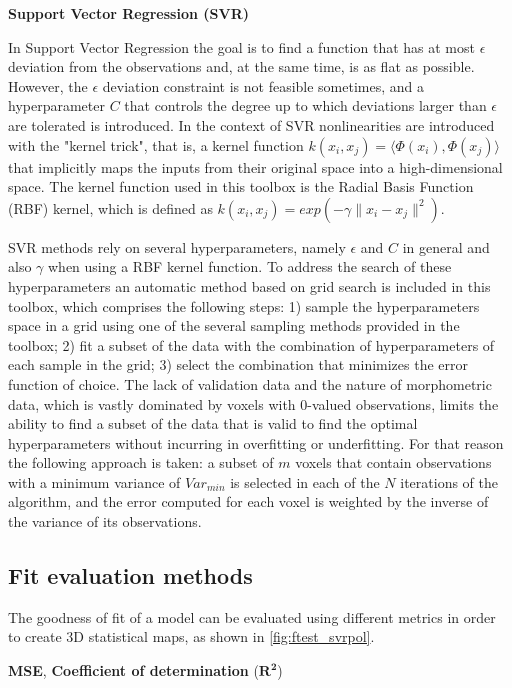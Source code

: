 \documentclass{article}
\begin{document}
\textbf{Support Vector Regression (SVR)} 

In Support Vector Regression the goal is to find a function that has at most $\epsilon$ deviation from the observations and, at the same time, is as flat as possible. However, the $\epsilon$ deviation constraint is not feasible sometimes, and a hyperparameter $C$ that controls the degree up to which deviations larger than $\epsilon$ are tolerated is introduced. 
In the context of SVR nonlinearities are introduced with the "kernel trick", that is, a kernel function $ k(x_i, x_j) = \langle \Phi(x_i), \Phi(x_j) \rangle $ that implicitly maps the inputs from their original space into a high-dimensional space. The kernel function used in this toolbox is the Radial Basis Function (RBF) kernel, which is defined as $ k(x_i, x_j) = exp(-\gamma \|x_i - x_j\|^2)$.

SVR methods rely on several hyperparameters, namely $\epsilon$ and $C$ in general and also $\gamma$ when using a RBF kernel function. To address the search of these hyperparameters an automatic method based on grid search is included in this toolbox, which comprises the following steps: 1) sample the hyperparameters space in a grid using one of the several sampling methods provided in the toolbox; 2) fit a subset of the data with the combination of hyperparameters of each sample in the grid; 3) select the combination that minimizes the error function of choice. 
The lack of validation data and the nature of morphometric data, which is vastly dominated by voxels with 0-valued observations, limits the ability to find a subset of the data that is valid to find the optimal hyperparameters without incurring in overfitting or underfitting. For that reason the following approach is taken: a subset of $m$ voxels that contain observations with a minimum variance of $Var_{min}$ is selected in each of the $N$ iterations of the algorithm, and the error computed for each voxel is weighted by the inverse of the variance of its observations. 

\subsection{Fit evaluation methods}

The goodness of fit of a model can be evaluated using different metrics in order to create 3D statistical maps, as shown in \autoref{fig:ftest_svrpol}.
		
\textbf{MSE}, \textbf{Coefficient of determination} ($\mathbf{R^2}$)
\end{document}
